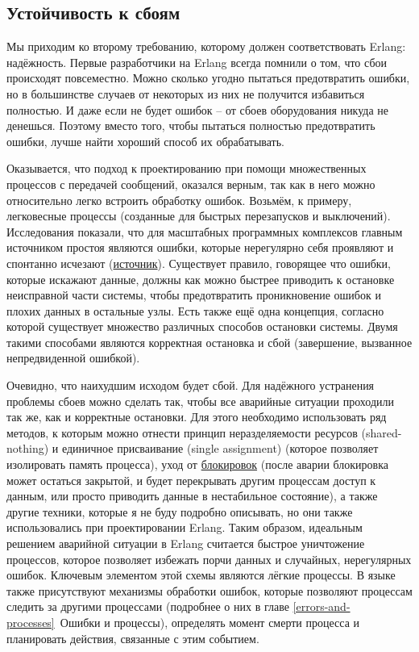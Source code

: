 \subsection{Устойчивость к сбоям}
\label{fault-tolerance}
Мы приходим ко второму требованию, которому должен соответствовать Erlang: надёжность.
Первые разработчики на Erlang всегда помнили о том, что сбои происходят повсеместно.
Можно сколько угодно пытаться предотвратить ошибки, но в большинстве случаев от некоторых из них не получится избавиться полностью.
И даже если не будет ошибок \--- от сбоев оборудования никуда не денешься.
Поэтому вместо того, чтобы пытаться полностью предотвратить ошибки, лучше найти хороший способ их обрабатывать.

Оказывается, что подход к проектированию при помощи множественных процессов с передачей сообщений, оказался верным, так как в него можно относительно легко встроить обработку ошибок.
Возьмём, к примеру, легковесные процессы (созданные для быстрых перезапусков и выключений).
Исследования показали, что для масштабных программных комплексов главным источником простоя являются ошибки, которые нерегулярно себя проявляют и спонтанно исчезают (\href{http://dslab.epfl.ch/pubs/crashonly/}{источник}).
Существует правило, говорящее что ошибки, которые искажают данные, должны как можно быстрее приводить к остановке неисправной части системы, чтобы предотвратить проникновение ошибок и плохих данных в остальные узлы.
Есть также ещё одна концепция, согласно которой существует множество различных способов остановки системы.
Двумя такими способами являются корректная остановка и сбой (завершение, вызванное непредвиденной ошибкой).

Очевидно, что наихудшим исходом будет сбой.
Для надёжного устранения проблемы сбоев можно сделать так, чтобы все аварийные ситуации проходили так же, как и корректные остановки.
Для этого необходимо использовать ряд методов, к которым можно отнести принцип неразделяемости ресурсов (shared-nothing) и единичное присваивание (single assignment) (которое позволяет изолировать память процесса), уход от \href{http://en.wikipedia.org/wiki/Lock_(computer_science)}{блокировок} (после аварии блокировка может остаться закрытой, и будет перекрывать другим процессам доступ к данным, или просто приводить данные в нестабильное состояние), а также другие техники, которые я не буду подробно описывать, но они также использовались при проектировании Erlang.
Таким образом, идеальным решением аварийной ситуации в Erlang считается быстрое уничтожение процессов, которое позволяет избежать порчи данных и случайных, нерегулярных ошибок.
Ключевым элементом этой схемы являются лёгкие процессы.
В языке также присутствуют механизмы обработки ошибок, которые позволяют процессам следить за другими процессами (подробнее о них в главе \ref{errors-and-processes}~Ошибки и процессы), определять момент смерти процесса и планировать действия, связанные с этим событием.

